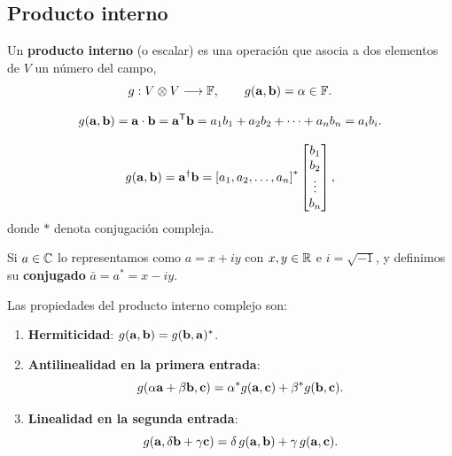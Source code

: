 \subsection{Producto interno}
\label{subsec:producto_interno}

\begin{definicion}
  \label{def:producto_interno}
  Un \textbf{producto interno} (o escalar) es una operaci\'on que asocia a dos
  elementos de $V$ un n\'umero del campo,
  \begin{equation}
    \label{eq:producto_interno}
    g:V\otimes V\longrightarrow\mathbb{F},
    \qquad
    g(\mathbf{a},\mathbf{b})=\alpha\in\mathbb{F} .
  \end{equation}
\end{definicion}

\begin{ejemplo}[Representaci\'on en $\R^n$]
  \label{ej:pi_real}
  \begin{equation}
    \label{eq:pi_real}
    g(\mathbf{a},\mathbf{b})=\mathbf{a}\cdot\mathbf{b}=\mathbf{a}^{\mathsf{T}}\mathbf{b}
      =a_1b_1+a_2b_2+\dots+a_nb_n=a_ib_i .
  \end{equation}
\end{ejemplo}

\begin{ejemplo}[Representaci\'on en $\C^n$]
  \label{ej:pi_complejo}
  \begin{equation}
    \label{eq:pi_complejo}
    g(\mathbf{a},\mathbf{b})=\mathbf{a}^\dagger\mathbf{b}
      =\left[ a_1,a_2,\dots,a_n \right]^{*}
      \begin{bmatrix}
        b_1\\b_2\\\vdots\\b_n
      \end{bmatrix},
  \end{equation}
  donde $*$ denota conjugaci\'on compleja.
\end{ejemplo}

\begin{observacion}
  Si $a\in\mathbb{C}$ lo representamos como $a=x+iy$ con $x,y\in\mathbb{R}$ e
  $i=\sqrt{-1}$, y definimos su \textbf{conjugado} $\bar{a}=a^{*}=x-iy$.
\end{observacion}

Las propiedades del producto interno complejo son:
\begin{enumerate}
  \item \textbf{Hermiticidad}: $g(\mathbf{a},\mathbf{b})=g(\mathbf{b},\mathbf{a})^{*}$.
  \item \textbf{Antilinealidad en la primera entrada}:
        \begin{equation}
          \label{eq:antilineal}
          g(\alpha\mathbf{a}+\beta\mathbf{b},\mathbf{c})
            =\alpha^{*}g(\mathbf{a},\mathbf{c})+\beta^{*}g(\mathbf{b},\mathbf{c}).
        \end{equation}
  \item \textbf{Linealidad en la segunda entrada}:
        \begin{equation}
          \label{eq:lineal}
          g(\mathbf{a},\delta\mathbf{b}+\gamma\mathbf{c})
            =\delta\, g(\mathbf{a},\mathbf{b})+\gamma\, g(\mathbf{a},\mathbf{c}).
        \end{equation}
\end{enumerate}

